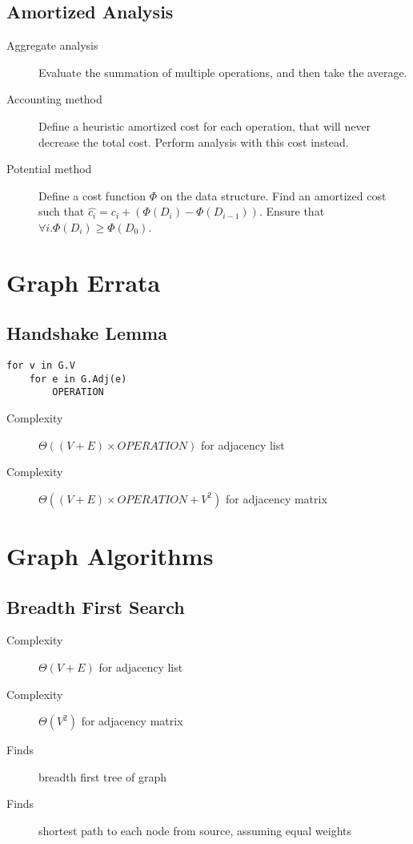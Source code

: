 \documentclass[landscape]{cheat}
\begin{document}
\begin{multicols*}{3}
\subsection{Amortized Analysis}
\begin{description}
    \item[Aggregate analysis] Evaluate the summation of multiple operations, and then take the average.
    \item[Accounting method] Define a heuristic amortized cost for each operation, that will never decrease the total cost.
        Perform analysis with this cost instead.
    \item[Potential method] Define a cost function $\Phi$ on the data structure. Find an amortized cost such that $\hat{c_i} = c_i + (\Phi(D_i) - \Phi(D_{i - 1}))$.
        Ensure that $\forall i. \Phi(D_i) \geq \Phi(D_0)$.
\end{description}

\section{Graph Errata}
\subsection{Handshake Lemma}
\begin{lstlisting}
for v in G.V
    for e in G.Adj(e)
        OPERATION
\end{lstlisting}
\begin{description}
    \item[Complexity] $\Theta((V+E) \times OPERATION)$ for adjacency list
    \item[Complexity] $\Theta((V+E) \times OPERATION + V^2)$ for adjacency matrix
\end{description}

\section{Graph Algorithms}

\subsection{Breadth First Search}
\begin{description}
    \item[Complexity] $\Theta(V+E)$ for adjacency list
    \item[Complexity] $\Theta(V^2)$ for adjacency matrix
    \item[Finds] breadth first tree of graph
    \item[Finds] shortest path to each node from source, assuming equal weights
\end{description}


\end{multicols*}
\end{document}
